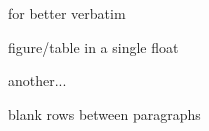 \usepackage{graphicx} %

\usepackage[strict]{csquotes}
\usepackage[natbib,backend=biber,style=authoryear-comp,maxbibnames=99]{
biblatex}


\usepackage[all]{foreign}

\usepackage{booktabs} %
\usepackage[inline]{enumitem}

\usepackage{verbatim} %
for better verbatim
\usepackage{caption} %
figure/table in a single float

\usepackage{hyperref}
another...
\usepackage{cleveref}

\usepackage{multirow}%


\usepackage[parfill]{parskip} %
blank rows between paragraphs
